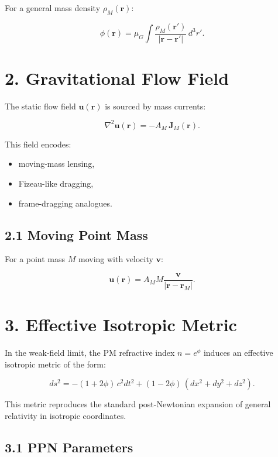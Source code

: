 \documentclass{article}
\begin{document}
For a general mass density $\rho_M(\mathbf r)$:



\[
\phi(\mathbf r)
=
\mu_G
\int
\frac{\rho_M(\mathbf r')}{|\mathbf r - \mathbf r'|}
\,d^3r'.
\]



\section*{2. Gravitational Flow Field}

The static flow field $\mathbf u(\mathbf r)$ is sourced by mass currents:



\[
\nabla^2 \mathbf u(\mathbf r)
=
- A_M\,\mathbf J_M(\mathbf r).
\]



This field encodes:

\begin{itemize}
    \item moving-mass lensing,
    \item Fizeau-like dragging,
    \item frame-dragging analogues.
\end{itemize}

\subsection*{2.1 Moving Point Mass}

For a point mass $M$ moving with velocity $\mathbf v$:



\[
\mathbf u(\mathbf r)
=
A_M M
\frac{\mathbf v}{|\mathbf r - \mathbf r_M|}.
\]



\section*{3. Effective Isotropic Metric}

In the weak-field limit, the PM refractive index $n = e^\phi$ induces an
effective isotropic metric of the form:



\[
ds^2
=
-(1 + 2\phi)\,c^2 dt^2
+
(1 - 2\phi)\,(dx^2 + dy^2 + dz^2).
\]



This metric reproduces the standard post-Newtonian expansion of general
relativity in isotropic coordinates.

\subsection*{3.1 PPN Parameters}
\end{document}
